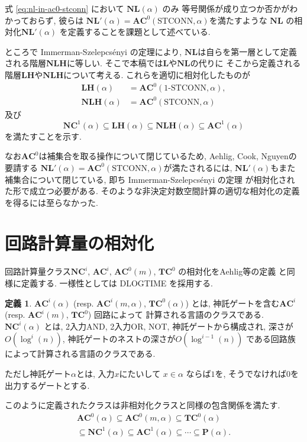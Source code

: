 \documentclass[10pt,a4paper,twocolumn]{jarticle}
\theoremstyle{definition}
\newtheorem{definition}[theorem]{定義}
\theoremstyle{remark}
\newcommand{\classfont}{\mathbf}
\newcommand{\AC}{\classfont{AC}}
\newcommand{\TC}{\classfont{TC}}
\newcommand{\NC}{\classfont{NC}}
\renewcommand{\L}{\classfont{L}}
\newcommand{\NL}{\classfont{NL}}
\renewcommand{\P}{\classfont{P}}
\newcommand{\LH}{\classfont{LH}}
\newcommand{\NLH}{\classfont{NLH}}
\newcommand{\probfont}{\text}
\newcommand{\oneSTCONN}{\probfont{1-STCONN}}
\newcommand{\STCONN}{\probfont{STCONN}}
\begin{document}
式 \eqref{eq:nl-in-ac0-stconn} において $\NL(\alpha)$ のみ
等号関係が成り立つか否かがわかっておらず, 
彼らは $\NL'(\alpha) = \AC^0(\STCONN, \alpha)$を満たすような
$\NL$ の相対化$\NL'(\alpha)$ を定義することを課題として述べている.

ところで Immerman-Szelepcs{\'e}nyi の定理により, 
$\NL$は自らを第一層として定義される階層$\NLH$に等しい. 
そこで本稿では$\L$や$\NL$の代りに
そこから定義される階層$\LH$や$\NLH$について考える. 
これらを適切に相対化したものが
\begin{align*}
 \LH(\alpha) &= \AC^0 (\oneSTCONN, \alpha),
 \\
 \NLH(\alpha) &= \AC^0(\STCONN, \alpha)
\end{align*}
及び
\begin{equation*}
 \NC^1(\alpha) \subseteq \LH(\alpha) \subseteq \NLH(\alpha) \subseteq \AC^1(\alpha)
\end{equation*}
を満たすことを示す.

なお$\AC^0$は補集合を取る操作について閉じているため,
Aehlig, Cook, Nguyenの要請する
$\NL'(\alpha) = \AC^0(\STCONN, \alpha)$が満たされるには, 
$\NL' (\alpha)$もまた補集合について閉じている, 
即ち Immerman-Szelepcs{\'e}nyi の定理 
\cite{immerman1988nondeterministic,szelepcsenyi1988method}
が相対化された形で成立つ必要がある. 
そのような非決定対数空間計算の適切な相対化の定義を得るには至らなかった. 

\section{回路計算量の相対化}

回路計算量クラス$\NC^i$, $\AC^i$, $\AC^0(m)$, $\TC^0$ の相対化をAehlig等の定義
\cite{aehlig2007relativizing} と同様に定義する.
一様性としては DLOGTIME を採用する.
\begin{definition}
$\AC^i(\alpha)$ (resp. $\AC^i(m, \alpha)$, $\TC^0(\alpha)$) とは,
神託ゲートを含む$\AC^i$ (resp. $\AC^i(m)$, $\TC^0$) 回路によって
計算される言語のクラスである.
$\NC^i(\alpha)$ とは, 2入力AND, 2入力OR, NOT, 神託ゲートから構成され,
深さが$O(\log^i(n))$, 神託ゲートのネストの深さが$O(\log^{i-1}(n))$
である回路族によって計算される言語のクラスである.
\end{definition}
ただし神託ゲート$\alpha$とは, 入力$x$にたいして $x \in \alpha$ ならば$1$を, 
そうでなければ$0$を出力するゲートとする.

このように定義されたクラスは非相対化クラスと同様の包含関係を満たす.
\begin{gather*}
 \AC^0(\alpha) \subseteq \AC^0(m, \alpha) \subseteq \TC^0(\alpha) \\
 \subseteq \NC^1(\alpha) \subseteq \AC^1(\alpha) \subseteq \cdots \subseteq \P(\alpha).
\end{gather*}
\end{document}
